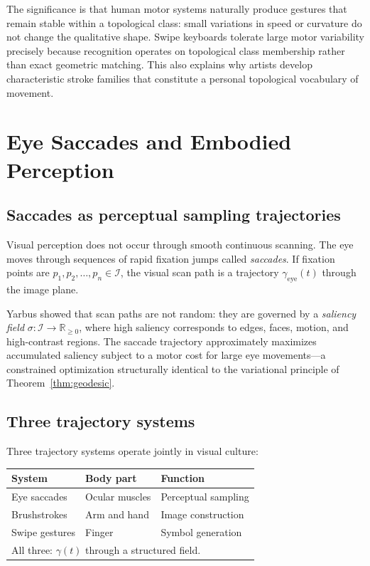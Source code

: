 \documentclass[12pt,a4paper]{article}
\theoremstyle{plain}
\theoremstyle{definition}
\begin{document}
The significance is that human motor systems naturally produce gestures that
remain stable within a topological class: small variations in speed or curvature
do not change the qualitative shape. Swipe keyboards tolerate large motor
variability precisely because recognition operates on topological class
membership rather than exact geometric matching. This also explains why artists
develop characteristic stroke families that constitute a personal topological
vocabulary of movement.

\section{Eye Saccades and Embodied Perception}
\label{sec:saccades}

\subsection{Saccades as perceptual sampling trajectories}

Visual perception does not occur through smooth continuous scanning. The eye
moves through sequences of rapid fixation jumps called \emph{saccades}. If
fixation points are $p_1,p_2,\dots,p_n\in\mathcal{I}$, the visual scan path
is a trajectory $\gamma_{\text{eye}}(t)$ through the image plane.

Yarbus \cite{yarbus1967} showed that scan paths are not random: they are
governed by a \emph{saliency field} $\sigma:\mathcal{I}\to\mathbb{R}_{\geq0}$,
where high saliency corresponds to edges, faces, motion, and high-contrast
regions. The saccade trajectory approximately maximizes accumulated saliency
subject to a motor cost for large eye movements---a constrained optimization
structurally identical to the variational principle of Theorem~\ref{thm:geodesic}.

\subsection{Three trajectory systems}

Three trajectory systems operate jointly in visual culture:

\begin{center}
\begin{tabular}{lll}
\toprule
System & Body part & Function \\
\midrule
Eye saccades   & Ocular muscles  & Perceptual sampling \\
Brushstrokes   & Arm and hand    & Image construction \\
Swipe gestures & Finger          & Symbol generation \\
\midrule
\multicolumn{3}{l}{All three: $\gamma(t)$ through a structured field.} \\
\bottomrule
\end{tabular}
\end{center}
\end{document}
